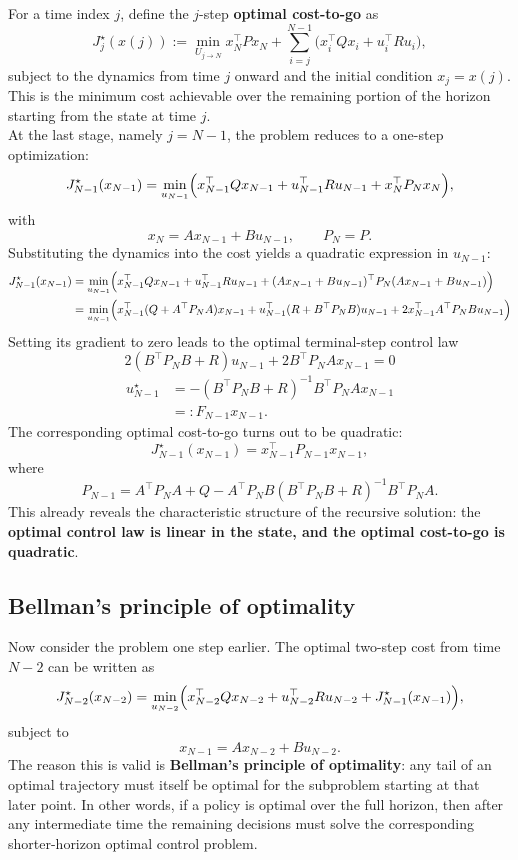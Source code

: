 For a time index $j$, define the $j$-step \textbf{optimal cost-to-go} as
\[
J_j^\star(x(j))
:=
\min_{U_{j\to N}}
x_N^\top P x_N
+
\sum_{i=j}^{N-1}
\bigl(x_i^\top Qx_i + u_i^\top Ru_i\bigr),
\]
subject to the dynamics from time $j$ onward and the initial condition $x_j=x(j)$. This is the minimum cost achievable over the remaining portion of the horizon starting from the state at time $j$.\\

At the last stage, namely $j=N-1$, the problem reduces to a one-step optimization:
\[
J_{N-1}^\star(x_{N-1})
=
\min_{u_{N-1}}
\Bigl(
x_{N-1}^\top Qx_{N-1}
+
u_{N-1}^\top Ru_{N-1}
+
x_N^\top P_N x_N
\Bigr),
\]
with
\[
x_N=Ax_{N-1}+Bu_{N-1},
\qquad
P_N=P.
\]
Substituting the dynamics into the cost yields a quadratic expression in $u_{N-1}$:
\begin{align*}
J_{N-1}^\star(x_{N-1}) &= \min_{u_{N-1}} \Bigl(x_{N-1}^\top Qx_{N-1}
+
u_{N-1}^\top Ru_{N-1}
+(Ax_{N-1}+Bu_{N-1})^\top P_N (Ax_{N-1}+Bu_{N-1})\Bigr)\\
&=\min_{u_{N-1}} \Bigl(x_{N-1}^\top (Q + A^\top P_N A) x_{N-1} + u_{N-1}^\top (R + B^\top P_N B) u_{N-1} + 2x_{N-1}^\top A^\top P_N B u_{N-1}\Bigr)
\end{align*}
Setting its gradient to zero leads to the optimal terminal-step control law
$$ 2 (B^\top P_N B + R) u_{N-1} + 2 B^\top P_N A x_{N-1} = 0$$
\begin{align*}
u_{N-1}^\star
&=
-(B^\top P_N B + R)^{-1}B^\top P_N A x_{N-1}\\
&=: F_{N-1}x_{N-1}.
\end{align*}
The corresponding optimal cost-to-go turns out to be quadratic:
\[
J_{N-1}^\star(x_{N-1})=x_{N-1}^\top P_{N-1}x_{N-1},
\]
where
\[
P_{N-1}
=
A^\top P_N A + Q
-
A^\top P_N B(B^\top P_N B + R)^{-1}B^\top P_N A.
\]
This already reveals the characteristic structure of the recursive solution: the \textbf{optimal control law is linear in the state, and the optimal cost-to-go is quadratic}.

\subsection{Bellman’s principle of optimality}

Now consider the problem one step earlier. The optimal two-step cost from time $N-2$ can be written as
\[
J_{N-2}^\star(x_{N-2})
=
\min_{u_{N-2}}
\Bigl(
x_{N-2}^\top Qx_{N-2}
+
u_{N-2}^\top Ru_{N-2}
+
J_{N-1}^\star(x_{N-1})
\Bigr),
\]
subject to
\[
x_{N-1}=Ax_{N-2}+Bu_{N-2}.
\]
The reason this is valid is \textbf{Bellman’s principle of optimality}: any tail of an optimal trajectory must itself be optimal for the subproblem starting at that later point. In other words, if a policy is optimal over the full horizon, then after any intermediate time the remaining decisions must solve the corresponding shorter-horizon optimal control problem.\\

